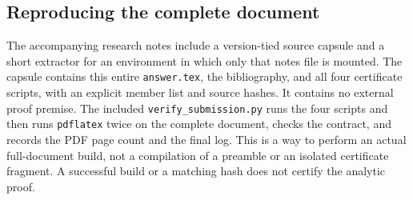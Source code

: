 \documentclass[12pt]{article}
\begin{document}
\subsection{Reproducing the complete document}
The accompanying research notes include a version-tied source capsule
and a short extractor for an environment in which only that notes file
is mounted.  The capsule contains this entire \texttt{answer.tex},
the bibliography, and all four certificate scripts, with an explicit
member list and source hashes.  It contains no external proof premise.
The included \texttt{verify\_submission.py} runs the four scripts and
then runs \texttt{pdflatex} twice on the complete document, checks
the contract, and records the PDF page count and the final log.
This is a way to perform an actual full-document build, not a
compilation of a preamble or an isolated certificate fragment.
A successful build or a matching hash does not certify the analytic
proof.
\end{document}
